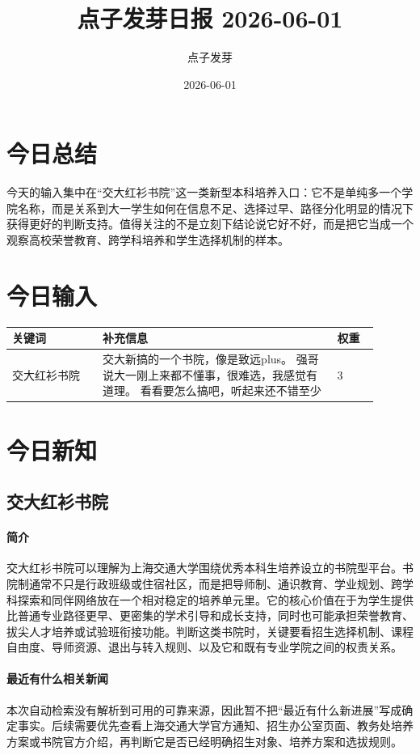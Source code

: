 \documentclass[UTF8,zihao=-4]{ctexart}
\title{\bfseries 点子发芽日报 2026-06-01}
\author{点子发芽}
\date{2026-06-01}
\begin{document}
\maketitle
\section*{今日总结}
今天的输入集中在“交大红衫书院”这一类新型本科培养入口：它不是单纯多一个学院名称，而是关系到大一学生如何在信息不足、选择过早、路径分化明显的情况下获得更好的判断支持。值得关注的不是立刻下结论说它好不好，而是把它当成一个观察高校荣誉教育、跨学科培养和学生选择机制的样本。
\section*{今日输入}
\begin{longtable}{|p{0.22\linewidth}|p{0.58\linewidth}|p{0.10\linewidth}|}
\hline
\textbf{关键词} & \textbf{补充信息} & \textbf{权重} \\
\hline
交大红衫书院 & 交大新搞的一个书院，像是致远plus。
强哥说大一刚上来都不懂事，很难选，我感觉有道理。
看看要怎么搞吧，听起来还不错至少 & 3 \\
\hline
\end{longtable}
\section*{今日新知}
\subsection*{交大红衫书院}
\paragraph{简介} 交大红衫书院可以理解为上海交通大学围绕优秀本科生培养设立的书院型平台。书院制通常不只是行政班级或住宿社区，而是把导师制、通识教育、学业规划、跨学科探索和同伴网络放在一个相对稳定的培养单元里。它的核心价值在于为学生提供比普通专业路径更早、更密集的学术引导和成长支持，同时也可能承担荣誉教育、拔尖人才培养或试验班衔接功能。判断这类书院时，关键要看招生选择机制、课程自由度、导师资源、退出与转入规则、以及它和既有专业学院之间的权责关系。
\paragraph{最近有什么相关新闻} 本次自动检索没有解析到可用的可靠来源，因此暂不把“最近有什么新进展”写成确定事实。后续需要优先查看上海交通大学官方通知、招生办公室页面、教务处培养方案或书院官方介绍，再判断它是否已经明确招生对象、培养方案和选拔规则。
\end{document}

